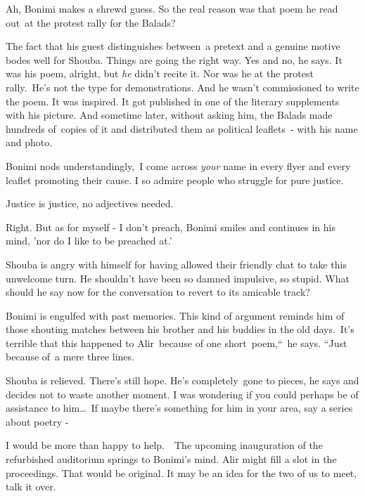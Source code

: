\documentclass[twoside,11pt]{book}
\begin{document}
{\textquotedbl}Ah,{\textquotedbl} Bonimi makes a shrewd guess. {\textquotedbl}So the real reason was that poem he read
out~at the protest rally for the Balads?{\textquotedbl}

The fact that his guest distinguishes between~a pretext and a genuine motive bodes well for Shouba. Things are going the
right way. {\textquotedbl}Yes and no,{\textquotedbl} he says. {\textquotedbl}It was his poem, alright, but \textit{he}
didn't recite it. Nor was he at the protest rally.\ He's not the type for demonstrations. And he wasn't commissioned to
write the poem. It was inspired. It got published in one of the literary supplements with his picture. And sometime
later, without asking him, the Balads made hundreds of~copies of it and distributed them as political leaflets\ {}-
with his name and photo.{\textquotedbl} 

Bonimi nods understandingly,~{\textquotedbl}I come across \textit{your }name in every flyer and every leaflet promoting
their cause. I so admire people who struggle for pure justice.{\textquotedbl}

{\textquotedbl}Justice is justice, no adjectives needed.{\textquotedbl}

{\textquotedbl}Right. But as for myself - I don't preach,{\textquotedbl} Bonimi smiles and continues in his mind, {}'nor
do I like to be preached at.'

Shouba is angry with himself for having allowed their friendly chat to take this unwelcome turn. He shouldn't have been
so damned impulsive, so stupid. What should he say now for the conversation to revert to its amicable track?

Bonimi is engulfed with past memories. This kind of argument reminds him of those shouting matches between his brother
and his buddies in the old days.\ {\textquotedbl}It's terrible that this happened to Alir\ because of one
short\ poem,``\  he says. ``Just because of{\ }{a }mere three lines.{\textquotedbl}\ 

Shouba is relieved. There's still hope. {\textquotedbl}He's completely~gone to pieces,{\textquotedbl} he says and
decides not to waste another moment. {\textquotedbl}I was wondering if you could perhaps be of assistance to
him{\dots}\ If maybe there's something for him in your area, say a series about poetry -{\textquotedbl}\ 

{\textquotedbl}I would be more than happy to help.{\textquotedbl}\ \ The upcoming inauguration of the refurbished
auditorium springs to Bonimi's mind. Alir might fill a slot in the proceedings. That would be original.
{\textquotedbl}It may be an idea for the two of us to meet, talk it over.{\textquotedbl}
\end{document}
